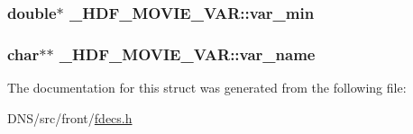 \subsubsection[{\texorpdfstring{var\+\_\+min}{var_min}}]{\setlength{\rightskip}{0pt plus 5cm}double$\ast$ \+\_\+\+H\+D\+F\+\_\+\+M\+O\+V\+I\+E\+\_\+\+V\+A\+R\+::var\+\_\+min}\hypertarget{struct___h_d_f___m_o_v_i_e___v_a_r_a7c283f201602d07f61252252d6715070}{}\label{struct___h_d_f___m_o_v_i_e___v_a_r_a7c283f201602d07f61252252d6715070}
\subsubsection[{\texorpdfstring{var\+\_\+name}{var_name}}]{\setlength{\rightskip}{0pt plus 5cm}char$\ast$$\ast$ \+\_\+\+H\+D\+F\+\_\+\+M\+O\+V\+I\+E\+\_\+\+V\+A\+R\+::var\+\_\+name}\hypertarget{struct___h_d_f___m_o_v_i_e___v_a_r_abe74fa810598e7ce778df19894a93f9e}{}\label{struct___h_d_f___m_o_v_i_e___v_a_r_abe74fa810598e7ce778df19894a93f9e}


The documentation for this struct was generated from the following file\+:\begin{DoxyCompactItemize}
\item 
D\+N\+S/src/front/\hyperlink{fdecs_8h}{fdecs.\+h}\end{DoxyCompactItemize}
